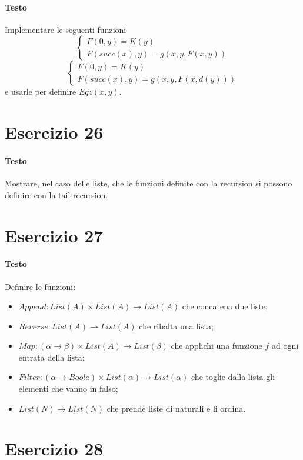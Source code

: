\documentclass[a4paper,10pt]{article}
\begin{document}
\paragraph{Testo}
Implementare le seguenti funzioni
$$\begin{cases} F(0,y) = K(y) \\ F(succ(x),y) = g(x,y,F(x,y)) \end{cases}$$
$$\begin{cases} F(0,y) = K(y) \\ F(succ(x),y) = g(x,y,F(x,d(y))) \end{cases}$$
e usarle per definire $Eqz(x,y)$.

\section*{Esercizio 26}
\paragraph{Testo}
Mostrare, nel caso delle liste, che le funzioni definite con la recursion si possono definire con la tail-recursion.

\section*{Esercizio 27}
\paragraph{Testo}
Definire le funzioni:
\begin{itemize}
\item $Append : List(A) \times List(A) \rightarrow List(A)$ che concatena due liste;
\item $Reverse : List(A) \rightarrow List(A)$ che ribalta una lista;
\item $Map : (\alpha \rightarrow \beta) \times List(A) \rightarrow List(\beta)$ che applichi una funzione $f$ ad ogni entrata della lista;
\item $Filter : (\alpha \rightarrow Boole) \times List(\alpha) \rightarrow List(\alpha)$ che toglie dalla lista gli elementi che vanno in falso;
\item $List(N) \rightarrow List(N)$ che prende liste di naturali e li ordina.
\end{itemize}

\section*{Esercizio 28}
\end{document}
